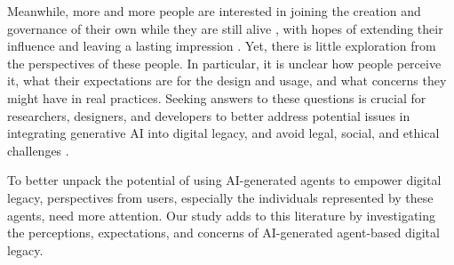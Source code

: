 Meanwhile, more and more people are interested in joining the creation and governance of their own  while they are still alive \cite{hereafter2022, rememory}, with hopes of extending their influence and leaving a lasting impression \cite{gulotta2017digital, brubaker2024ai, morris2024generative}. Yet, there is little exploration from the perspectives of these people. In particular, it is unclear how people perceive it, what their expectations are for the design and usage, and what concerns they might have in real practices. Seeking answers to these questions is crucial for researchers, designers, and developers to better address potential issues in integrating generative AI into digital legacy, and avoid legal, social, and ethical challenges \cite{guardian2024george, weidinger2023sociotechnical}.

To better unpack the potential of using AI-generated agents to empower digital legacy, perspectives from users, especially the individuals represented by these agents, need more attention. Our study adds to this literature by investigating the perceptions, expectations, and concerns of AI-generated agent-based digital legacy.